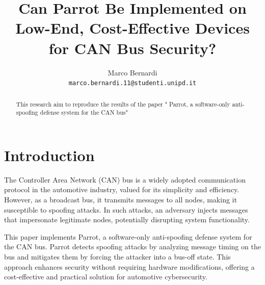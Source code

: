 \documentclass[10pt,twocolumn,letterpaper]{article}
\begin{document}
\title{Can Parrot Be Implemented on Low-End, Cost-Effective Devices for CAN Bus Security?}

\author{
Marco Bernardi \\
{\tt\small marco.bernardi.11@studenti.unipd.it}
}

\maketitle

\begin{abstract}This research aim to reproduce the results of the
    paper " Parrot, a software-only anti-spoofing defense
    system for the CAN bus"~\cite{dagan2016parrot}
\end{abstract}

\section{Introduction}
The Controller Area Network (CAN) bus is a widely adopted communication protocol in the automotive industry, valued for its simplicity and efficiency. 
However, as a broadcast bus, it transmits messages to all nodes, making it susceptible to spoofing attacks. 
In such attacks, an adversary injects messages that impersonate legitimate nodes, potentially disrupting system functionality.

This paper implements Parrot, a software-only anti-spoofing defense system for the CAN bus. 
Parrot detects spoofing attacks by analyzing message timing on the bus and mitigates them by forcing the attacker into a bus-off state. 
This approach enhances security without requiring hardware modifications, offering a cost-effective and practical solution for automotive cybersecurity.
\end{document}
